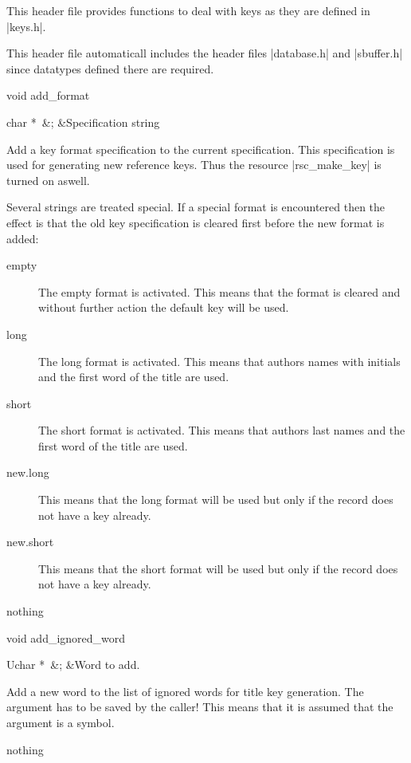 This header file provides functions to deal with keys as they
are defined in |keys.h|. 

This header file automaticall includes the header files
|database.h| and |sbuffer.h| since datatypes defined there are
required. 



\begin{Function}{void }{add\_format}
  \begin{Arguments}
    char *\ 	&;	&Specification string
  \end{Arguments}%
  Add a key format specification to the current
  specification.  This specification is used for
  generating new reference keys. Thus the resource
  |rsc_make_key| is turned on aswell.
  
  Several strings are treated special. If a special
  format is encountered then the effect is that the old
  key specification is cleared first before the new
  format is added:
  \begin{description}
  \item[empty] The empty format is activated. This means that
  the format is cleared and without further action the
  default key will be used.
  \item[long] The long format is activated. This means that
  authors names with initials and the first word of
  the title are used.
  \item[short] The short format is activated. This means that
  authors last names and the first word of the title
  are used. 
  \item[new.long] This means that the long format will
  be used but only if the record does not have a key
  already. 
  \item[new.short] This means that the short format will
  be used but only if the record does not have a key
  already. 
  \end{description}
  \begin{Result}
    nothing
  \end{Result}
\end{Function}
\begin{Function}{void }{add\_ignored\_word}
  \begin{Arguments}
    Uchar *\ 	&;	&Word to add.
  \end{Arguments}%
  Add a new word to the list of ignored words for title
  key generation.
  The argument has to be saved by the caller! This means
  that it is assumed that the argument is a symbol.
  \begin{Result}
    nothing
  \end{Result}
\end{Function}
